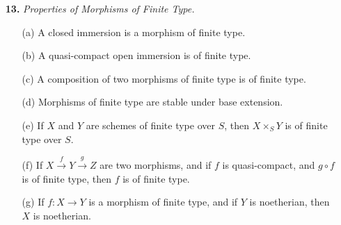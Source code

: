 \documentclass[a4paper]{article}
\begin{document}
\begin{enumerate} [label=\textbf{\arabic*.}, leftmargin=0em]
\begin{proof}
\begin{itemize} [leftmargin=0cm]
                  \item[(c)] By taking an affine cover of $X$, we reduce to the case when $X = \spec{A}$ is affine. Let $\goth{a}$ be the ideal in $A$ that corresponds to the reduced induced structured of $Y$. By part (b), there exists an ideal $\goth{b}$ in $A$ such that $Y' = \spec{A / \goth{b}}$. A morphism of schemes $Y \to Y'$ corresponds to a ring homomorphism $A / \goth{b} \to A / \goth{a}$. Recall that $\goth{a}$ is the largest ideal of $A$ such that $V(\goth{a}) = \text{sp}(Y) = \text{sp}(Y')$; in particular, $\goth{b} \subseteq \goth{a}$, so the natural projection map $A / \goth{b} \to A / \goth{a}$ is well-defined and is the desired ring homomorphism.

                  \item[(d)] Again, reduce to the affine case. A morphism of affine schemes $f : \spec{B} \to \spec{A}$ correspond to a ring homomorphism $\varphi : A \to B$. Then $Y = \spec{A / \ker{\varphi}}$ is the desired closed subscheme. If $Z$ is reduced, then $B$ is a reduced ring. Then $\ker{\varphi}$ contains the nilradical of $A$, so $A / \ker{\varphi}$ is reduced, hence the intersection of all prime ideals of $A / \ker{\varphi}$ is the zero ideal.
              \end{itemize}
          \end{proof}

    \item[\textbf{13.}] \textit{Properties of Morphisms of Finite Type.}
          \begin{itemize}
              \item[(a)] A closed immersion is a morphism of finite type.
              \item[(b)] A quasi-compact open immersion is of finite type.
              \item[(c)] A composition of two morphisms of finite type is of finite type.
              \item[(d)] Morphisms of finite type are stable under base extension.
              \item[(e)] If $X$ and $Y$ are schemes of finite type over $S$, then $X \times_S Y$ is of finite type over $S$.
              \item[(f)] If $X \xrightarrow{f} Y \xrightarrow{g} Z$ are two morphisms, and if $f$ is quasi-compact, and $g \circ f$ is of finite type, then $f$ is of finite type.
              \item[(g)] If $f : X \to Y$ is a morphism of finite type, and if $Y$ is noetherian, then $X$ is noetherian.
          \end{itemize}


\end{enumerate}
\end{document}
